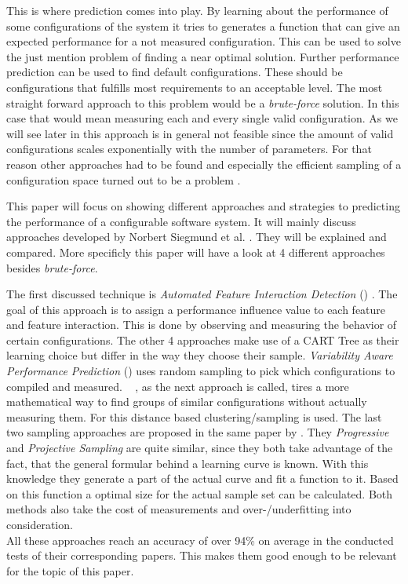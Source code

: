 This is where prediction comes into play. By learning about the performance of some configurations of the system it tries to generates a function that can give an expected performance for a not measured configuration. This can be used to solve the just mention problem of finding a near optimal solution.
Further performance prediction can be used to find default configurations. These should be configurations that fulfills most requirements to an acceptable level. 
The most straight forward  approach to this problem would be a \textit{brute-force} solution. In this case that would mean measuring each and every single valid configuration. As we will see later in  this approach is in general not feasible since the amount of valid configurations scales exponentially with the number of parameters. For that reason other approaches had to be found and especially the efficient sampling of a configuration space turned out to be a problem \cite{CostEfficientSampling_Gou_Siegmund_2015}. 

This paper will focus on showing different approaches and strategies to predicting the performance of a configurable software system. It will mainly discuss approaches developed by Norbert Siegmund et al. \cite{AutomatedFeatureDetectionSiegmund2012,VariabilityAwarePerformancePredictionJianmeiSigmundApel,CostEfficientSampling_Gou_Siegmund_2015, DistanceBasedSampling2019}. They will be explained and compared. More specificly this paper will have a look at 4 different approaches besides \textit{brute-force}.

The first discussed technique is \textit{Automated Feature Interaction Detection} (\AFID) \cite{AutomatedFeatureDetectionSiegmund2012}. The goal of this approach is to assign a performance influence value to each feature and feature interaction. This is done by observing and measuring the behavior of certain configurations. 
The other 4 approaches make use of a CART Tree as their learning choice but differ in the way they choose their sample. 
\textit{Variability Aware Performance Prediction} (\VAPP) \cite{VariabilityAwarePerformancePredictionJianmeiSigmundApel} uses random sampling to pick which configurations to compiled and measured. 
\WHAT~ \cite{DistanceBasedSampling2019}, as the next approach is called, tires a more mathematical way to find groups of similar configurations without actually measuring them. For this distance based clustering/sampling is used. 
The last two sampling approaches are proposed in the same paper by \citet{CostEfficientSampling_Gou_Siegmund_2015}. They \textit{Progressive} and \textit{Projective Sampling} are quite similar, since they both take advantage of the fact, that the general formular behind a learning curve is known. With this knowledge they generate a part of the actual curve and fit a function to it. Based on this function a optimal size for the actual sample set can be calculated. Both methods also take the cost of measurements and over-/underfitting into consideration.\\
All these approaches reach an accuracy of over 94\% on average in the conducted tests of their corresponding papers. This makes them good enough to be relevant for the topic of this paper.